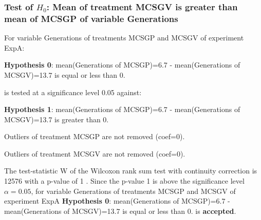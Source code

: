 \begin{frame}[t]
 \frametitle{Test of $H_{0}$: Mean of treatment MCSGV is greater than mean of MCSGP of variable Generations }
 \scriptsize
 For variable Generations of treatments MCSGP and MCSGV of experiment ExpA:

\vspace{1mm}
{\bf Hypothesis 0}: mean(Generations of MCSGP)=6.7 - mean(Generations of MCSGV)=13.7 is equal or less than 0.


 \begin{center} is tested at a significance level 0.05 against: \end{center}

{\bf Hypothesis 1}: mean(Generations of MCSGP)=6.7 - mean(Generations of MCSGV)=13.7 is greater than 0.
\vspace{1mm}
\vspace{1mm}

 Outliers of treatment MCSGP  are not removed (coef=0).

 Outliers of treatment MCSGV  are not removed (coef=0).
\vspace{1mm}
 
 The test-statistic W of the Wilcoxon rank sum test with continuity correction is 12576 with a p-value of 1 .
 Since the p-value 1 is above the significance level $\alpha= 0.05 $,
 for variable Generations of treatments MCSGP and MCSGV of experiment ExpA 
 {\bf Hypothesis 0}: mean(Generations of MCSGP)=6.7 - mean(Generations of MCSGV)=13.7 is equal or less than 0.
is {\bf accepted}.

 \end{frame}
